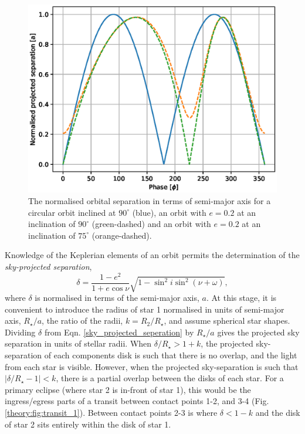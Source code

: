 \begin{figure}
\includegraphics[]{4-images/orbital_seperation}
\caption{The normalised orbital separation in terms of semi-major axis for a circular orbit inclined at $90^{\circ }$ (blue), an orbit with $e = 0.2$ at an inclination of $90^{\circ }$ (green-dashed) and an orbit with $e = 0.2$ at an inclination of $75^{\circ }$ (orange-dashed).}
\label{theory:fig:orbital_seperation}
\end{figure}


Knowledge of the Keplerian elements of an orbit permits the determination of the \textit{sky-projected separation},
%
\begin{equation}\label{sky_projected_seperation}
\delta = \frac{1 - e^2}{1 + e \cos \nu} \sqrt{1 - \sin^2i \sin^2(\nu + \omega)},
\end{equation}
%
where $\delta$ is normalised in terms of the semi-major axis, $a$. At this stage, it is convenient to introduce the radius of star 1 normalised in units of semi-major axis, $R_\star / a$, the ratio of the radii, $k = R_2 / R_\star$, and assume spherical star shapes. Dividing $\delta$ from Eqn. \ref{sky_projected_seperation} by $R_\star / a$ gives the projected sky separation in units of stellar radii. When $\delta / R_\star > 1 + k$, the projected sky-separation of each components disk is such that there is no overlap, and the light from each star is visible. However, when the projected sky-separation is such that $|\delta / R_\star - 1| < k$, there is a partial overlap between the disks of each star. For a primary eclipse (where star 2 is in-front of star 1), this would be the ingress/egress parts of a transit between contact points 1-2, and 3-4 (Fig. \ref{theory:fig:transit_1}). Between contact points 2-3 is where $\delta < 1 - k$ and the disk of star 2 sits entirely within the disk of star 1. 


